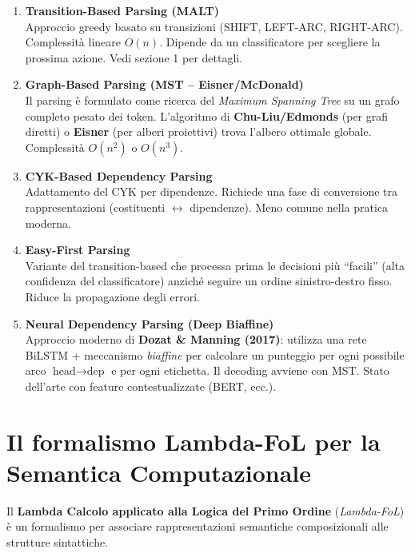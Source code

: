 \documentclass[12pt,a4paper]{article}
\begin{document}
\begin{enumerate}[leftmargin=1.5em, label=\textbf{\arabic*.}]
  \item \textbf{Transition-Based Parsing (MALT)} \\
    Approccio greedy basato su transizioni (SHIFT, LEFT-ARC, RIGHT-ARC). Complessità lineare $O(n)$. Dipende da un classificatore per scegliere la prossima azione. Vedi sezione 1 per dettagli.

  \item \textbf{Graph-Based Parsing (MST -- Eisner/McDonald)} \\
    Il parsing è formulato come ricerca del \emph{Maximum Spanning Tree} su un grafo completo pesato dei token. L'algoritmo di \textbf{Chu-Liu/Edmonds} (per grafi diretti) o \textbf{Eisner} (per alberi proiettivi) trova l'albero ottimale globale. Complessità $O(n^2)$ o $O(n^3)$.

  \item \textbf{CYK-Based Dependency Parsing} \\
    Adattamento del CYK per dipendenze. Richiede una fase di conversione tra rappresentazioni (costituenti $\leftrightarrow$ dipendenze). Meno comune nella pratica moderna.

  \item \textbf{Easy-First Parsing} \\
    Variante del transition-based che processa prima le decisioni più ``facili'' (alta confidenza del classificatore) anziché seguire un ordine sinistro-destro fisso. Riduce la propagazione degli errori.

  \item \textbf{Neural Dependency Parsing (Deep Biaffine)} \\
    Approccio moderno di \textbf{Dozat \& Manning (2017)}: utilizza una rete BiLSTM + meccanismo \emph{biaffine} per calcolare un punteggio per ogni possibile arco $\text{head} \to \text{dep}$ e per ogni etichetta. Il decoding avviene con MST. Stato dell'arte con feature contestualizzate (BERT, ecc.).
\end{enumerate}

\section{Il formalismo Lambda-FoL per la Semantica Computazionale}

Il \textbf{Lambda Calcolo applicato alla Logica del Primo Ordine} (\emph{Lambda-FoL}) è un formalismo per associare rappresentazioni semantiche composizionali alle strutture sintattiche.
\end{document}
